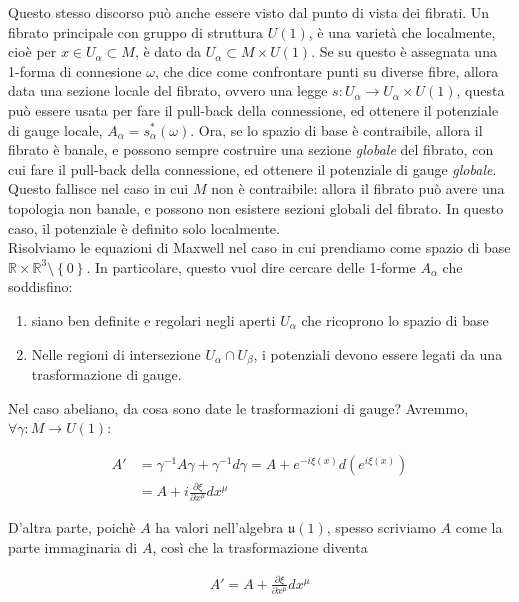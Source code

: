 \documentclass{report}
\begin{document}
Questo stesso discorso può anche essere visto dal punto di vista dei fibrati. Un fibrato principale con gruppo di struttura \(U(1)\), è una varietà che localmente, cioè per \(x \in U_\alpha \subset M\), è dato da \(U_\alpha \subset M \times U(1)\). Se su questo è assegnata una 1-forma di connesione \(\omega\), che dice come confrontare punti su diverse fibre, allora data una sezione locale del fibrato, ovvero una legge \(s: U_\alpha \rightarrow U_\alpha \times U(1)\), questa può essere usata per fare il pull-back della connessione, ed ottenere il potenziale di gauge locale, \(A_\alpha = s_\alpha^*(\omega)\). Ora, se lo spazio di base è contraibile, allora il fibrato è banale, e possono sempre costruire una sezione \emph{globale} del fibrato, con cui fare il pull-back della connessione, ed ottenere il potenziale di gauge \emph{globale}. Questo fallisce nel caso in cui \(M\) non è contraibile: allora il fibrato può avere una topologia non banale, e possono non esistere sezioni globali del fibrato. In questo caso, il potenziale è definito solo localmente. \\

Risolviamo le equazioni di Maxwell nel caso in cui prendiamo come spazio di base \(\mathbb{R}\times \mathbb{R}^3 \setminus \left\{0\right\}\). In particolare, questo vuol dire cercare delle 1-forme \(A_\alpha\) che soddisfino: 

\begin{enumerate}
    \item siano ben definite e regolari negli aperti \(U_\alpha\) che ricoprono lo spazio di base
    \item Nelle regioni di intersezione \(U_\alpha \cap U_\beta\), i potenziali devono essere legati da una trasformazione di gauge. 
\end{enumerate}

Nel caso abeliano, da cosa sono date le trasformazioni di gauge? Avremmo, \(\forall \gamma: M \rightarrow U(1)\): 

\begin{align}
    A' &= \gamma^{-1}A\gamma + \gamma^{-1} d\gamma = A + e^{-i\xi(x)}d(e^{i\xi(x)}) \\
    &= A + i \frac{\partial \xi}{\partial x^{\mu}}dx^{\mu}
\end{align}

D'altra parte, poichè \(A\) ha valori nell'algebra \(\mathfrak{u}(1)\), spesso scriviamo \(A\) come la parte immaginaria di \(A\), così che la trasformazione diventa 

\begin{align}
    A' = A + \frac{\partial \xi}{\partial x^{\mu}}dx^{\mu}
\end{align}
\end{document}
